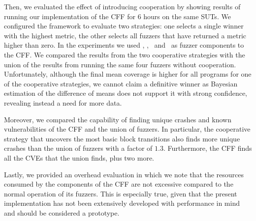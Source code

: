 Then, we evaluated the effect of introducing cooperation by showing results of
running our implementation of the \ac{CFF} for 6 hours on the same \acp{SUT}. We
configured the framework to evaluate two strategies: one selects a single winner
with the highest metric, the other selects all fuzzers that have returned a
metric higher than zero. In the experiments we used \aflfast, \fairfuzz,
\honggfuzz\ and \vuzzer\ as fuzzer components to the \ac{CFF}. We compared the
results from the two cooperative strategies with the union of the results from
running the same four fuzzers without cooperation. Unfortunately, although the
final mean coverage is higher for all programs for one of the cooperative
strategies, we cannot claim a definitive winner as Bayesian estimation of the
difference of means does not support it with strong confidence, revealing
instead a need for more data.

Moreover, we compared the capability of finding unique crashes and known
vulnerabilities of the \ac{CFF} and the union of fuzzers. In particular, the
cooperative strategy that uncovers the most basic block transitions also finds
more unique crashes than the union of fuzzers with a factor of $1.3$.
Furthermore, the \ac{CFF} finds all the \acp{CVE} that the union finds, plus two
more.

Lastly, we provided an overhead evaluation in which we note that the resources
consumed by the components of the \ac{CFF} are not excessive compared to the
normal operation of its fuzzers. This is especially true, given that the present
implementation has not been extensively developed with performance in mind and
should be considered a prototype.

